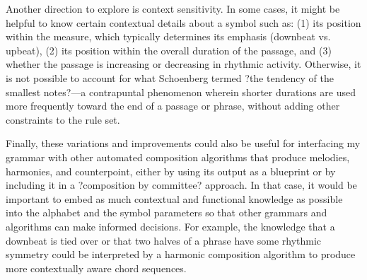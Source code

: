 \documentclass{article}
\begin{document}
Another direction to explore is context sensitivity. In some cases, it might be helpful to know certain contextual details about a symbol such as: (1) its position within the measure, which typically determines its emphasis (downbeat vs. upbeat), (2) its position within the overall duration of the passage, and (3) whether the passage is increasing or decreasing in rhythmic activity. Otherwise, it is not possible to account for what Schoenberg termed ?the tendency of the smallest notes?\cite{schoenberg}---a contrapuntal phenomenon wherein shorter durations are used more frequently toward the end of a passage or phrase, without adding other constraints to the rule set.

Finally, these variations and improvements could also be useful for interfacing my grammar with other automated composition algorithms that produce melodies, harmonies, and counterpoint, either by using its output as a blueprint or by including it in a ?composition by committee? approach. In that case, it would be important to embed as much contextual and functional knowledge as possible into the alphabet and the symbol parameters so that other grammars and algorithms can make informed decisions. For example, the knowledge that a downbeat is tied over or that two halves of a phrase have some rhythmic symmetry could be interpreted by a harmonic composition algorithm to produce more contextually aware chord sequences.


\end{document}
